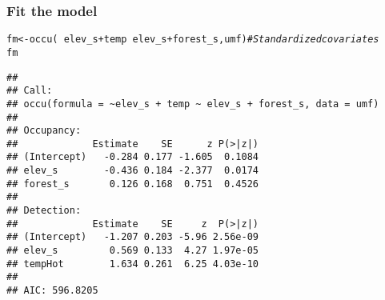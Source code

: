 \documentclass[color=usenames,dvipsnames]{beamer}\usepackage[]{graphicx}\usepackage[]{xcolor}
\makeatletter
\newcommand{\hlcom}[1]{\textcolor[rgb]{0.514,0.506,0.514}{\textit{#1}}}%
\newcommand{\hlopt}[1]{\textcolor[rgb]{0,0,0}{#1}}%
\newcommand{\hldef}[1]{\textcolor[rgb]{0,0,0}{#1}}%
\newcommand{\hlkwb}[1]{\textcolor[rgb]{0,0.341,0.682}{#1}}%
\newcommand{\hlkwd}[1]{\textcolor[rgb]{0.004,0.004,0.506}{#1}}%
\newenvironment{kframe}{%
 \def\at@end@of@kframe{}%
 \ifinner\ifhmode%
  \def\at@end@of@kframe{\end{minipage}}%
  \begin{minipage}{\columnwidth}%
 \fi\fi%
 \def\FrameCommand##1{\hskip\@totalleftmargin \hskip-\fboxsep
 \colorbox{shadecolor}{##1}\hskip-\fboxsep
     \hskip-\linewidth \hskip-\@totalleftmargin \hskip\columnwidth}%
 \MakeFramed {\advance\hsize-\width
   \@totalleftmargin\z@ \linewidth\hsize
   \@setminipage}}%
 {\par\unskip\endMakeFramed%
 \at@end@of@kframe}
\newenvironment{knitrout}{}{} %
\makeatother
\begin{document}
\begin{frame}[fragile]
  \frametitle{Fit the model}
  \footnotesize
\begin{knitrout}\scriptsize
{}\color{fgcolor}\begin{kframe}
\begin{alltt}
\hldef{fm} \hlkwb{<-} \hlkwd{occu}\hldef{(}\hlopt{~}\hldef{elev_s}\hlopt{+}\hldef{temp} \hlopt{~}\hldef{elev_s}\hlopt{+}\hldef{forest_s, umf)} \hlcom{# Standardized covariates}
\hldef{fm}
\end{alltt}
\begin{verbatim}
## 
## Call:
## occu(formula = ~elev_s + temp ~ elev_s + forest_s, data = umf)
## 
## Occupancy:
##             Estimate    SE      z P(>|z|)
## (Intercept)   -0.284 0.177 -1.605  0.1084
## elev_s        -0.436 0.184 -2.377  0.0174
## forest_s       0.126 0.168  0.751  0.4526
## 
## Detection:
##             Estimate    SE     z  P(>|z|)
## (Intercept)   -1.207 0.203 -5.96 2.56e-09
## elev_s         0.569 0.133  4.27 1.97e-05
## tempHot        1.634 0.261  6.25 4.03e-10
## 
## AIC: 596.8205
\end{verbatim}
\end{kframe}
\end{knitrout}
\end{frame}
\end{document}

